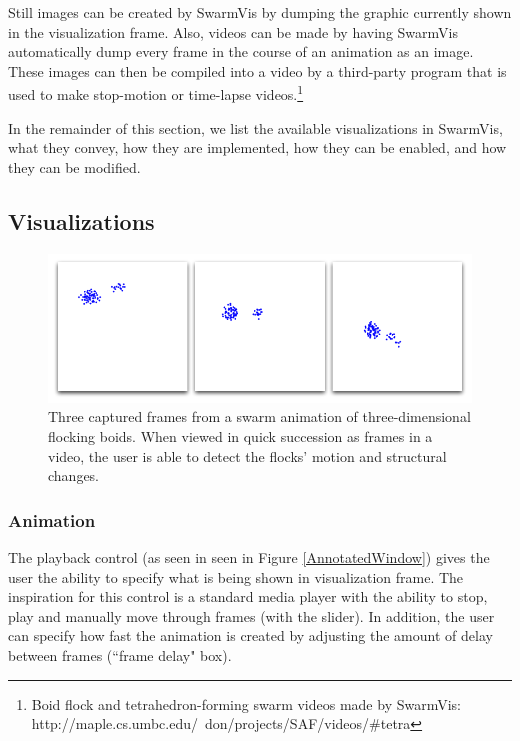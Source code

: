 \documentclass[conference]{IEEEtran}
\begin{document}
Still images can be created by SwarmVis by dumping the graphic currently shown in the visualization frame.
Also, videos can be made by having SwarmVis automatically dump every frame in the course of an animation as an image.
These images can then be compiled into a video by a third-party program that is used to make stop-motion or time-lapse
videos.\footnote{Boid flock and tetrahedron-forming swarm videos made by SwarmVis:\\
 http://maple.cs.umbc.edu/~don/projects/SAF/videos/\#tetra}

In the remainder of this section, we list the available visualizations in SwarmVis, what they convey, how they are implemented,
how they can be enabled, and how they can be modified.


\subsection{Visualizations}





\begin{figure}
\centering
\includegraphics[scale=.282]{images/animation.png}
\caption{
Three captured frames from a swarm animation of three-dimensional flocking boids\cite{reynolds1987}.
When viewed in quick succession as frames in a video, the user
is able to detect the flocks' motion and structural changes.}
\label{Animation}
\end{figure}

\subsubsection{Animation}

The playback control (as seen in  seen in Figure \ref{AnnotatedWindow})
gives the user the ability to specify what is being shown in visualization frame.
The inspiration for this control is a standard media player with the ability to stop,
play and manually move through frames (with the slider).
In addition, the user can specify how fast the animation is created by adjusting the amount of delay between
frames (``frame delay" box).
\end{document}
